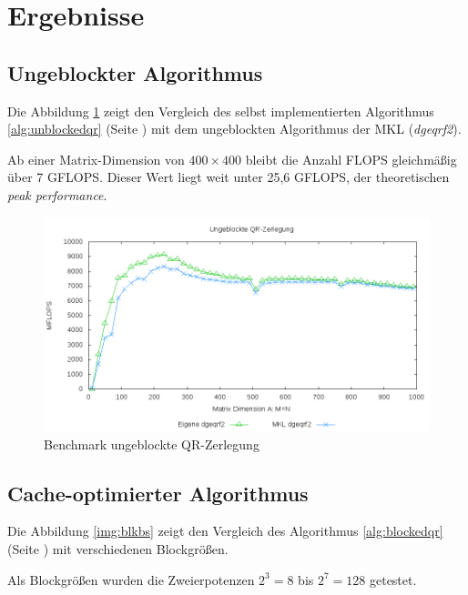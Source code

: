 \newpage
\section{Ergebnisse}
\subsection{Ungeblockter Algorithmus}
Die Abbildung \ref{img:unblk} zeigt den Vergleich des selbst implementierten Algorithmus \ref{alg:unblockedqr} (Seite \pageref{alg:unblockedqr}) mit dem ungeblockten Algorithmus der MKL (\textit{dgeqrf2}).

Ab einer Matrix-Dimension von $400 \times 400$ bleibt die Anzahl FLOPS gleichmäßig über 7 GFLOPS. Dieser Wert liegt weit unter 25,6 GFLOPS, der theoretischen \textit{peak performance}. 




\begin{figure}[H]
	\includegraphics[width=\textwidth]{images/unblk.png}
	\caption{Benchmark ungeblockte QR-Zerlegung}
	\label{img:unblk}
\end{figure}



\subsection{Cache-optimierter Algorithmus}

Die Abbildung \ref{img:blkbs} zeigt den Vergleich des Algorithmus \ref{alg:blockedqr} (Seite \pageref{alg:blockedqr}) mit verschiedenen Blockgrößen.

Als Blockgrößen wurden die Zweierpotenzen $2^3 = 8$ bis $2^7 = 128$ getestet.


